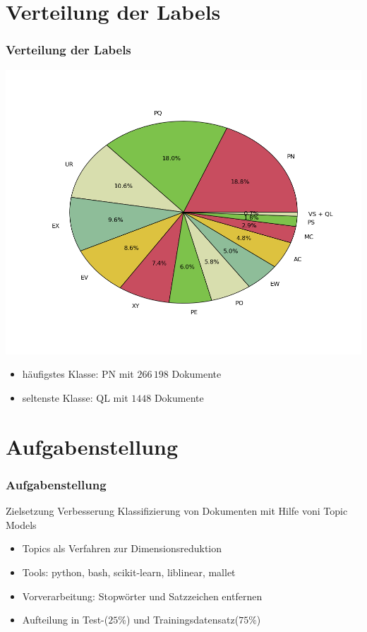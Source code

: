 \documentclass[12pt, xcolor=table]{beamer}
\begin{document}
\section{Verteilung der Labels}
\begin{frame}
    \frametitle{Verteilung der Labels}
    \begin{center}
        \includegraphics[scale=0.3]{figures/labels_fancy.png}
    \end{center}
    \begin{itemize}
        \item häufigstes Klasse: PN mit $266\, 198$ Dokumente
        \item seltenste Klasse: QL mit $1448$ Dokumente
    \end{itemize}
\end{frame}

\section{Aufgabenstellung}
\begin{frame}
    \frametitle{Aufgabenstellung}
    \begin{block}{Zielsetzung}
        Verbesserung Klassifizierung von Dokumenten mit Hilfe voni Topic Models
    \end{block}
    \begin{itemize}
        \item Topics als Verfahren zur Dimensionsreduktion
        \item  Tools: python, bash, scikit-learn, liblinear, mallet
        \item  Vorverarbeitung: Stopwörter und Satzzeichen entfernen
        \item  Aufteilung in Test-($25 \%$) und Trainingsdatensatz($75 \%$)
    \end{itemize}
\end{frame}
\end{document}
